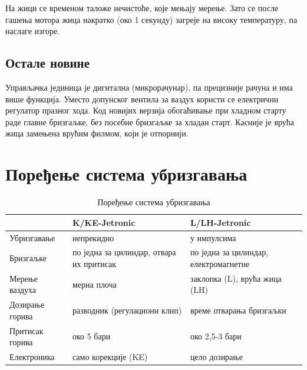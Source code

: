 \documentclass{report}
\begin{document}
На жици се временом таложе нечистоће, које мењају мерење. Зато се после
гашења мотора жица накратко (око 1 секунду) загреје на високу температуру, па
наслаге изгоре.

\subsection{Остале новине}

Управљачка јединица је дигитална (микрорачунар), па прецизније рачуна и има
више функција. Уместо допунског вентила за ваздух користи се електрични
регулатор празног хода. Код новијих верзија обогаћивање при хладном старту
раде главне бризгаљке, без посебне бризгаљке за хладан старт. Касније је
врућа жица замењена врућим филмом, који је отпорнији.

\section{Поређење система убризгавања}

\begin{table}[H]
    \centering
    \small
    \begin{tabular}{p{2.6cm} p{3.4cm} p{3.4cm}}
        \toprule
                         & \textbf{K/KE-Jetronic}            & \textbf{L/LH-Jetronic}                      \\
        \midrule
        Убризгавање      & непрекидно                        & у импулсима                                \\
        Бризгаљке        & по једна за цилиндар, отвара их притисак & по једна за цилиндар, електромагнетне\\
        Мерење ваздуха   & мерна плоча                       & заклопка (L), врућа жица (LH)              \\
        Дозирање горива  & разводник (регулациони клип)      & време отварања бризгаљки                   \\
        Притисак горива  & око 5 бари                         & око 2,5-3 бари                           \\
        Електроника      & само корекције (KE)               & цело дозирање                              \\
        \bottomrule
    \end{tabular}
    \caption{Поређење система убризгавања}
    \label{tab:poredjenje}
\end{table}
\end{document}
